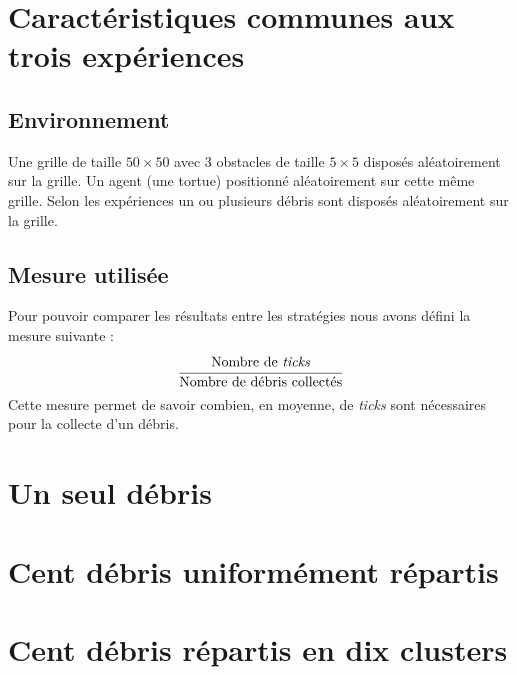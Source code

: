 \section{Caractéristiques communes aux trois expériences}
\subsection{Environnement}
Une grille de taille $50 \times 50$ avec 3 obstacles de taille $5 \times 5$
disposés aléatoirement sur la grille. Un agent (une tortue) positionné aléatoirement
sur cette même grille. Selon les expériences un ou plusieurs débris sont disposés 
aléatoirement sur la grille.
\subsection{Mesure utilisée}
Pour pouvoir comparer les résultats entre les stratégies nous avons défini
la mesure suivante : $$\cfrac{\text{Nombre de \emph{ticks}}}{\text{Nombre de débris collectés}}$$
Cette mesure permet de savoir combien, en moyenne, de \emph{ticks} sont nécessaires
pour la collecte d'un débris.
\section{Un seul débris}



\section{Cent débris uniformément répartis}



\section{Cent débris répartis en dix clusters}

